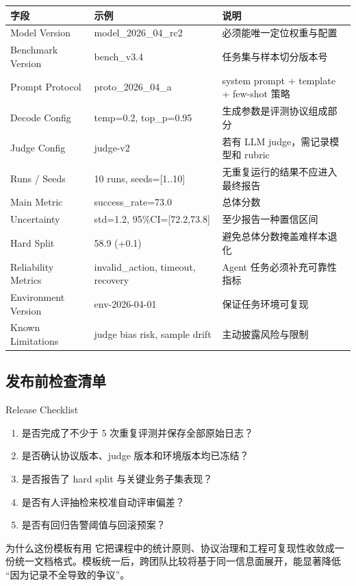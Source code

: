 \documentclass[a4paper]{article}
\begin{document}
\begin{longtable}{p{2.9cm}p{3.7cm}p{4.5cm}}
\toprule
\textbf{字段} & \textbf{示例} & \textbf{说明} \\
\midrule
Model Version & model\_2026\_04\_rc2 & 必须能唯一定位权重与配置 \\
Benchmark Version & bench\_v3.4 & 任务集与样本切分版本号 \\
Prompt Protocol & proto\_2026\_04\_a & system prompt + template + few-shot 策略 \\
Decode Config & temp=0.2, top\_p=0.95 & 生成参数是评测协议组成部分 \\
Judge Config & judge-v2 & 若有 LLM judge，需记录模型和 rubric \\
Runs / Seeds & 10 runs, seeds=[1..10] & 无重复运行的结果不应进入最终报告 \\
Main Metric & success\_rate=73.0 & 总体分数 \\
Uncertainty & std=1.2, 95\%CI=[72.2,73.8] & 至少报告一种置信区间 \\
Hard Split & 58.9 (+0.1) & 避免总体分数掩盖难样本退化 \\
Reliability Metrics & invalid\_action, timeout, recovery & Agent 任务必须补充可靠性指标 \\
Environment Version & env-2026-04-01 & 保证任务环境可复现 \\
Known Limitations & judge bias risk, sample drift & 主动披露风险与限制 \\
\bottomrule
\end{longtable}

\subsection{发布前检查清单}
\begin{importantbox}{Release Checklist}
\begin{enumerate}
    \item 是否完成了不少于 5 次重复评测并保存全部原始日志？
    \item 是否确认协议版本、judge 版本和环境版本均已冻结？
    \item 是否报告了 hard split 与关键业务子集表现？
    \item 是否有人评抽检来校准自动评审偏差？
    \item 是否有回归告警阈值与回滚预案？
\end{enumerate}
\end{importantbox}

\begin{knowledgebox}{为什么这份模板有用}
它把课程中的统计原则、协议治理和工程可复现性收敛成一份统一文档格式。模板统一后，跨团队比较将基于同一信息面展开，能显著降低 ``因为记录不全导致的争议''。
\end{knowledgebox}
\end{document}
